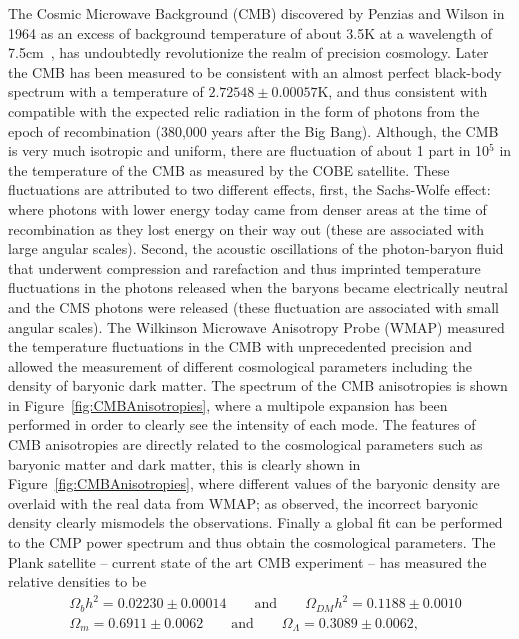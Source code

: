 The Cosmic Microwave Background (CMB) discovered by Penzias and Wilson
in 1964 as an excess of background temperature of about 3.5\unit{K} at a
wavelength of 7.5\unit{cm}~\cite{CMBDiscovery}, has undoubtedly
revolutionize the realm of precision cosmology. Later the CMB
has been measured to be consistent with an almost perfect black-body
spectrum with a temperature of  $2.72548\pm0.00057$\unit{K}, and thus
consistent with compatible with the expected relic radiation in the
form of photons from the epoch of recombination (380,000 years after
the Big Bang). Although, the CMB is very much isotropic and uniform, there are
fluctuation of about 1 part in 10$^{5}$ in the temperature of the CMB
as measured by the COBE satellite. These fluctuations are attributed
to two different effects, first, the Sachs-Wolfe effect: where photons
with lower energy today came from denser areas at the time of
recombination as they lost energy on their way out (these are
associated with large angular scales). Second, the acoustic
oscillations of the photon-baryon fluid that underwent compression and
rarefaction and thus imprinted temperature fluctuations in the
photons released when the baryons became electrically neutral and the
CMS photons were released (these fluctuation are associated with small
angular scales). The Wilkinson Microwave Anisotropy Probe (WMAP)
measured the temperature fluctuations in the CMB with unprecedented
precision and allowed the measurement of different cosmological
parameters including the density of baryonic dark matter. The
spectrum of the CMB anisotropies is shown in
Figure~\ref{fig:CMBAnisotropies}, where a multipole expansion has been
performed in order to clearly see the intensity of each mode. The
features of CMB anisotropies are directly related to the cosmological
parameters such as baryonic matter and dark matter, this is clearly
shown in Figure~\ref{fig:CMBAnisotropies}, where different values of
the baryonic density are overlaid with the real data from WMAP; as
observed, the incorrect baryonic density clearly mismodels the
observations. Finally a global fit can be performed to the CMP power
spectrum and thus obtain the cosmological parameters. The Plank
satellite -- current state of the art CMB experiment --  has measured
the  relative densities to be~\cite{plank}
\begin{equation}
\label{eq:plank}
\begin{aligned}
       &\Omega_{b}h^{2} = 0.02230\pm0.00014
        \qquad \text{and}  \qquad  \Omega_{DM}h^{2} = 0.1188\pm0.0010\\
        &\Omega_{m}= 0.6911\pm0.0062
        \qquad \text{and}  \qquad  \Omega_{\Lambda} = 0.3089\pm0.0062,
       \end{aligned}
\end{equation}


